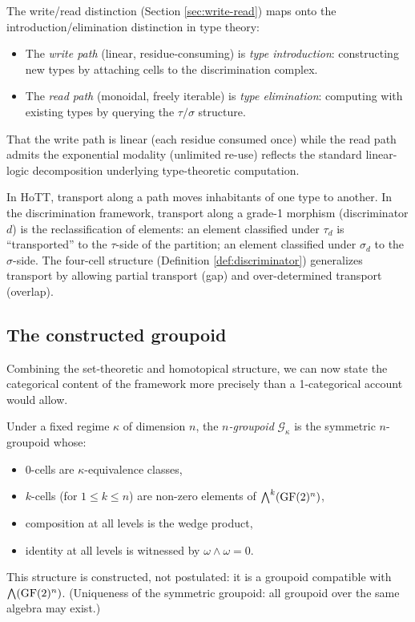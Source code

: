 \begin{remark}\label{rem:hott-paths}
The write/read distinction (Section \ref{sec:write-read})
maps onto the introduction/elimination distinction in type
theory:
\begin{itemize}[nosep]
  \item The \emph{write path} (linear, residue-consuming)
    is \emph{type introduction}: constructing new types by
    attaching cells to the discrimination complex.
  \item The \emph{read path} (monoidal, freely iterable)
    is \emph{type elimination}: computing with existing
    types by querying the $\tau/\sigma$ structure.
\end{itemize}
That the write path is linear (each residue consumed once)
while the read path admits the exponential modality
(unlimited re-use) reflects the standard linear-logic
decomposition underlying type-theoretic computation.
\end{remark}

\begin{remark}
In HoTT, transport along a path moves inhabitants of one
type to another. In the discrimination framework, transport
along a grade-1 morphism (discriminator $d$) is the
reclassification of elements: an element classified under
$\tau_d$ is ``transported'' to the $\tau$-side of the
partition; an element classified under $\sigma_d$ to the
$\sigma$-side. The four-cell structure
(Definition \ref{def:discriminator}) generalizes transport
by allowing partial transport (gap) and over-determined
transport (overlap).
\end{remark}

\subsection{The constructed groupoid}

Combining the set-theoretic and homotopical structure, we
can now state the categorical content of the framework
more precisely than a 1-categorical account would allow.

\begin{definition}\label{def:n-groupoid}
Under a fixed regime $\kappa$ of dimension $n$, the
\emph{$n$-groupoid} $\mathcal{G}_\kappa$ is the
symmetric $n$-groupoid whose:
\begin{itemize}[nosep]
  \item 0-cells are $\kappa$-equivalence classes,
  \item $k$-cells (for $1 \leq k \leq n$) are non-zero
    elements of $\bigwedge^k(\operatorname{GF}(2)^n)$,
  \item composition at all levels is the wedge product,
  \item identity at all levels is witnessed by
    $\omega \wedge \omega = 0$.
\end{itemize}
This structure is constructed, not postulated: it is
a groupoid compatible with $\bigwedge(\operatorname{GF}(2)^n)$.
(Uniqueness of the symmetric groupoid: all groupoid
over the same algebra may exist.)
\end{definition}

